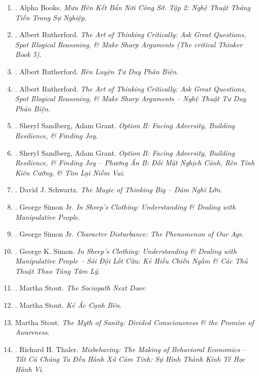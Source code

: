 \documentclass{article}
\begin{document}
\begin{enumerate}
	\item \cite{muu_hen_ke_ban_tap_2}. Alpha Books. \textit{Mưu Hèn Kết Bẩn Nơi Công Sở. Tập 2: Nghệ Thuật Thăng Tiến Trong Sự Nghiệp}.\hfill{\sf[finished]}
	\item \cite{Rutherford2020}. Albert Rutherford. \textit{The Art of Thinking Critically: Ask Great Questions, Spot Illogical Reasoning, \& Make Sharp Arguments (The critical Thinker Book 5)}.\hfill{\sf[reading]}
	\item \cite{Rutherford2022}. Albert Rutherford. \textit{Rèn Luyện Tư Duy Phản Biện}.\hfill{\sf[finished]}
	\item \cite{Rutherford2023}. Albert Rutherford. \textit{The Art of Thinking Critically: Ask Great Questions, Spot Illogical Reasoning, \& Make Sharp Arguments -- Nghệ Thuật Tư Duy Phản Biện}.\hfill{\sf[finished]}
	\item \cite{Sandberg_Grant2017}. Sheryl Sandberg, Adam Grant. \textit{Option B: Facing Adversity, Building Resilience, \& Finding Joy}.\hfill{\sf[reading]}
	\item \cite{Sandberg_Grant2019}. Sheryl Sandberg, Adam Grant. \textit{Option B: Facing Adversity, Building Resilience, \& Finding Joy -- Phương Án B: Đối Mặt Nghịch Cảnh, Rèn Tính Kiên Cường, \& Tìm Lại Niềm Vui}.\hfill{\sf[finished]}
	\item \cite{Schwartz2019}. David J. Schwartz. \textit{The Magic of Thinking Big -- Dám Nghĩ Lớn}.\hfill{\sf[finished]}
	\item \cite{Simon2010}. George Simon Jr. \textit{In Sheep's Clothing: Understanding \& Dealing with Manipulative People}.\hfill{\sf[reading]}
	\item \cite{Simon2011}. George Simon Jr. \textit{Character Disturbance: The Phenomenon of Our Age}.\hfill{\sf[finished]}
	\item \cite{Simon2022}. George K. Simon. \textit{In Sheep's Clothing: Understanding \& Dealing with Manipulative People -- Sói Đội Lốt Cừu: Kẻ Hiếu Chiến Ngầm \& Các Thủ Thuật Thao Túng Tâm Lý}.\hfill{\sf[finished]}
	\item \cite{Stout2006}. Martha Stout. \textit{The Sociopath Next Door}.\hfill{\sf[reading]}
	\item \cite{Stout2019}. Martha Stout. \textit{Kẻ Ác Cạnh Bên}.\hfill{\sf[finished]}	
	\item Martha Stout. \textit{The Myth of Sanity: Divided Consciousness \& the Promise of Awareness}.	
	\item \cite{Thaler_misbehaving}. Richard H. Thaler. \textit{Misbehaving: The Making of Behavioral Economics -- Tất Cả Chúng Ta Đều Hành Xử Cảm Tính: Sự Hình Thành Kinh Tế Học Hành Vi}.\hfill{\sf[reading]}

\end{enumerate}
\end{document}
